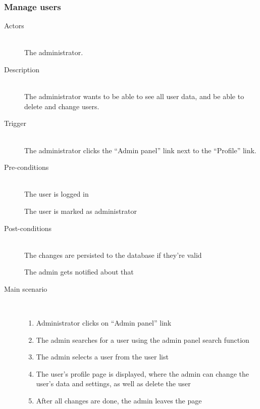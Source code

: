 \documentclass[a4wide]{article}
\begin{document}
\subsubsection{Manage users}
\begin{description}
\item[Actors]\mbox{}\\
The administrator.
\item[Description]\mbox{}\\
The administrator wants to be able to see all user data, and be able to delete and change users.

\item[Trigger]\mbox{}\\
The administrator clicks the “Admin panel” link next to the “Profile” link.
\item[Pre-conditions]\mbox{}\\
The user is logged in

The user is marked as administrator

\item[Post-conditions]\mbox{}\\
The changes are persisted to the database if they’re valid

The admin gets notified about that

\item[Main scenario]\mbox{}\\
\begin{enumerate}
\item Administrator clicks on “Admin panel” link
\item The admin searches for a user using the admin panel search function
\item The admin selects a user from the user list
\item The user’s profile page is displayed, where the admin can change the user’s data and settings, as well as delete the user
\item After all changes are done, the admin leaves the page
\end{enumerate}

\end{description}
\end{document}
